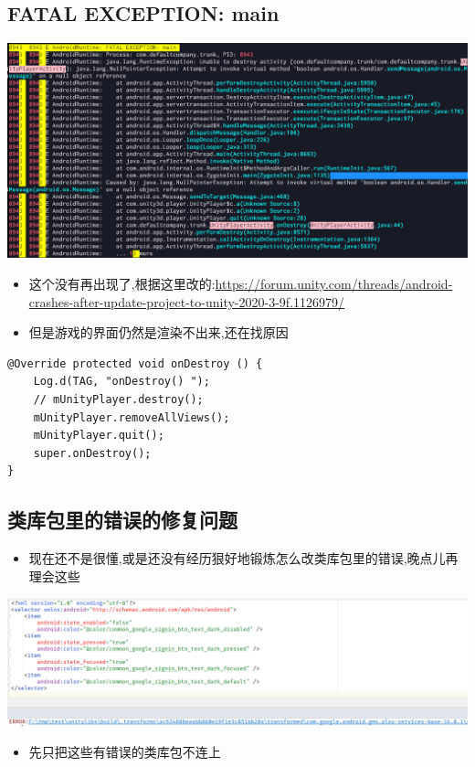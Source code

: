 \documentclass[9pt, b5paper]{article}
\begin{document}
\subsection{FATAL EXCEPTION: main}
\label{sec-8-1}

\includegraphics[width=.9\linewidth]{./pic/unityToAndroid_20221124_101807.png}
\begin{itemize}
\item 这个没有再出现了,根据这里改的:\url{https://forum.unity.com/threads/android-crashes-after-update-project-to-unity-2020-3-9f.1126979/}
\item 但是游戏的界面仍然是渲染不出来,还在找原因
\end{itemize}
\begin{verbatim}
@Override protected void onDestroy () {
    Log.d(TAG, "onDestroy() ");
    // mUnityPlayer.destroy();
    mUnityPlayer.removeAllViews();
    mUnityPlayer.quit();
    super.onDestroy();
}
\end{verbatim}
\subsection{类库包里的错误的修复问题}
\label{sec-8-2}
\begin{itemize}
\item 现在还不是很懂,或是还没有经历狠好地锻炼怎么改类库包里的错误,晚点儿再理会这些
\end{itemize}

\includegraphics[width=.9\linewidth]{./pic/unityToAndroid_20221124_163004.png}
\begin{itemize}
\item 先只把这些有错误的类库包不连上
\end{itemize}
\end{document}
